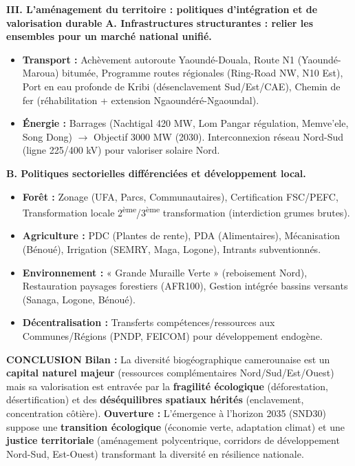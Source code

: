 \documentclass[11pt]{article}
\begin{document}
\begin{exoresolu}
\textbf{III. L'aménagement du territoire : politiques d'intégration et de valorisation durable}
\textbf{A. Infrastructures structurantes : relier les ensembles pour un marché national unifié.}
\begin{itemize}
    \item \textbf{Transport :} Achèvement autoroute Yaoundé-Douala, Route N1 (Yaoundé-Maroua) bitumée, Programme routes régionales (Ring-Road NW, N10 Est), Port en eau profonde de Kribi (désenclavement Sud/Est/CAE), Chemin de fer (réhabilitation + extension Ngaoundéré-Ngaoundal).
    \item \textbf{Énergie :} Barrages (Nachtigal 420 MW, Lom Pangar régulation, Memve'ele, Song Dong) $\rightarrow$ Objectif 3000 MW (2030). Interconnexion réseau Nord-Sud (ligne 225/400 kV) pour valoriser solaire Nord.
\end{itemize}
\textbf{B. Politiques sectorielles différenciées et développement local.}
\begin{itemize}
    \item \textbf{Forêt :} Zonage (UFA, Parcs, Communautaires), Certification FSC/PEFC, Transformation locale 2\textsuperscript{ème}/3\textsuperscript{ème} transformation (interdiction grumes brutes).
    \item \textbf{Agriculture :} PDC (Plantes de rente), PDA (Alimentaires), Mécanisation (Bénoué), Irrigation (SEMRY, Maga, Logone), Intrants subventionnés.
    \item \textbf{Environnement :} « Grande Muraille Verte » (reboisement Nord), Restauration paysages forestiers (AFR100), Gestion intégrée bassins versants (Sanaga, Logone, Bénoué).
    \item \textbf{Décentralisation :} Transferts compétences/ressources aux Communes/Régions (PNDP, FEICOM) pour développement endogène.
\end{itemize}

\textbf{CONCLUSION}
\textbf{Bilan :} La diversité biogéographique camerounaise est un \textbf{capital naturel majeur} (ressources complémentaires Nord/Sud/Est/Ouest) mais sa valorisation est entravée par la \textbf{fragilité écologique} (déforestation, désertification) et des \textbf{déséquilibres spatiaux hérités} (enclavement, concentration côtière).
\textbf{Ouverture :} L'émergence à l'horizon 2035 (SND30) suppose une \textbf{transition écologique} (économie verte, adaptation climat) et une \textbf{justice territoriale} (aménagement polycentrique, corridors de développement Nord-Sud, Est-Ouest) transformant la diversité en résilience nationale.
\end{exoresolu}
\end{document}
